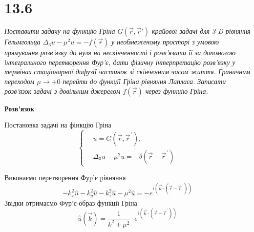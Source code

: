 %
%
%
%
%

\section[Задача №13.6]{13.6}

\textit{Поставити задачу на функцію Гріна $G(\vec{r},\vec{r}')$ крайової задачі для 3-D рівняння Гельмгольца $\Delta_3 u - \mu^2 u = -f(\vec{r})$ у необмеженому просторі з умовою прямування розв’язку до нуля на нескінченності і розв’язати її за допомогою інтегрального перетворення Фур’є, дати фізичну інтерпретацію розв’язку у термінах стаціонарної дифузії частинок зі скінченним часом життя. Граничним переходом $\mu \to +0$ перейти до функції Гріна рівняння Лапласа. Записати розв’язок задачі з довільним джерелом $f(\vec{r})$ через функцію Гріна.}

\begin{center}
    \large{\textbf{Розв'язок}}
\end{center}

Постановка задачі на фінкцію Гріна 
\begin{equation}
    \left\{ \begin{aligned}
        \,& u = G(\vec{r}, \vec{r}^{\,\prime}),\\
        & \Delta_3 u - \mu^2 u = -\delta(\vec{r} - \vec{r}^{\,\prime})
    \end{aligned} \right.
\end{equation}

Виконаємо перетворення Фур'є рівняння
\begin{equation*}
    - k_x^2 \hat{u} - k_y^2 \hat{u} - k_z^2 \hat{u} - \mu^2 \hat{u} = -e^{i(\vec{k} \cdot (\vec{r} - \vec{r}^{\,\prime}))}
\end{equation*}
Звідки отримаємо Фур'є-образ функції Гріна
\begin{equation}
    \hat{u}(\vec{k}) = \frac{1}{k^2 + \mu^2} \cdot e^{i(\vec{k} \cdot (\vec{r} - \vec{r}^{\,\prime}))}
\end{equation} 

